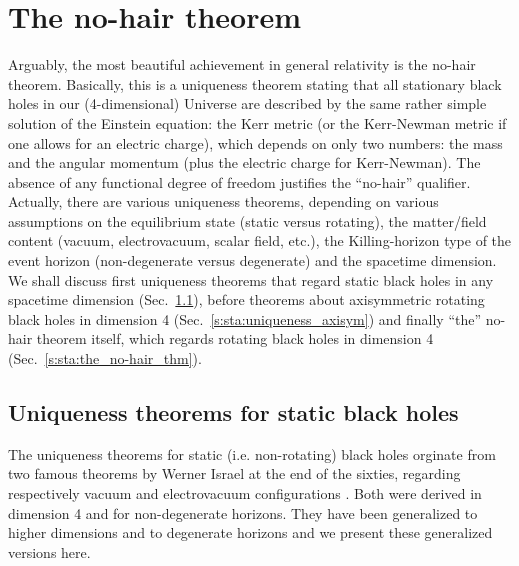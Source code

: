 
\section{The no-hair theorem} \label{s:sta:no-hair}

Arguably, the most beautiful achievement in general relativity is the
no-hair theorem.
Basically, this is a uniqueness theorem stating that all stationary black holes in our (4-dimensional) Universe are
described by the same rather simple solution of the Einstein equation: the Kerr metric
(or the Kerr-Newman metric if one allows for an electric charge), which depends on only
two numbers: the mass and the angular momentum (plus the electric charge for Kerr-Newman).
The absence of any functional degree of freedom justifies the ``no-hair'' qualifier.
Actually, there are various uniqueness theorems, depending on various assumptions
on the equilibrium state (static versus rotating),
the matter/field content (vacuum, electrovacuum, scalar field, etc.),
the Killing-horizon type of the event horizon (non-degenerate versus degenerate) and the spacetime
dimension. We shall discuss first uniqueness theorems that regard static black holes
in any spacetime dimension (Sec.~\ref{s:sta:uniqueness_static}), before
theorems about axisymmetric rotating black holes in dimension 4 (Sec.~\ref{s:sta:uniqueness_axisym})
and finally ``the'' no-hair theorem itself, which regards rotating black holes in dimension 4
(Sec.~\ref{s:sta:the_no-hair_thm}).

\subsection{Uniqueness theorems for static black holes} \label{s:sta:uniqueness_static}

The uniqueness theorems for static (i.e. non-rotating) black holes orginate from
two famous theorems by Werner Israel at the end of the sixties,
regarding respectively vacuum \cite{Israe67}
and electrovacuum configurations \cite{Israe68}. Both were derived in dimension 4
and for non-degenerate horizons. They have been generalized to higher dimensions
and to degenerate horizons and we present these generalized versions here.

